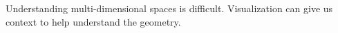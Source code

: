 
Understanding multi-dimensional spaces is difficult. Visualization can give
us context to help understand the geometry. 







